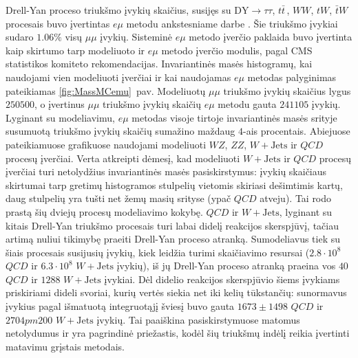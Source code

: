 \documentclass[a4paper, 12pt, oneside]{article}
\newcommand{\ZZ}{Z\! Z}
\newcommand{\WZ}{W\! Z}
\newcommand{\emu}{e\mu}
\newcommand{\WJets}{W\! +\!\mathrm{Jets}}
\newcommand{\DYtau}{\mathrm{DY} \! \rightarrow \! \tau\tau}
\newcommand{\QCD}{QC\! D}
\begin{document}
Drell-Yan proceso triukšmo įvykių skaičius, susijęs su $\DYtau$, $t\bar{t}\,$, $WW$, $tW$, $\bar{t}W$ procesais buvo įvertintas
$\emu$ metodu ankstesniame darbe \cite{MAk2}.
Šie triukšmo įvykiai sudaro $1.06\%$ visų $\mu\mu$ įvykių.
Sisteminė $\emu$ metodo įverčio paklaida buvo įvertinta kaip skirtumo tarp modeliuoto ir $\emu$ metodo įverčio modulis, pagal
CMS statistikos komiteto rekomendacijas.
Invariantinės masės histogramų, kai naudojami vien modeliuoti įverčiai ir kai naudojamas $\emu$ metodas palyginimas pateikiamas
\ref{fig:MassMCemu}~pav.
Modeliuotų $\mu\mu$ triukšmo įvykių skaičius lygus $250500$, o įvertinus $\mu\mu$ triukšmo įvykių skaičių  $e\mu$ metodu
gauta $241105$ įvykių.
Lyginant su modeliavimu, $\emu$ metodas visoje tirtoje invariantinės masės srityje susumuotą triukšmo įvykių skaičių
sumažino maždaug $4$-ais procentais.
Abiejuose pateikiamuose grafikuose naudojami modeliuoti $\WZ$, $\ZZ$, $\WJets$ ir $\QCD$ procesų įverčiai.
Verta atkreipti dėmesį, kad modeliuoti $\WJets$ ir $\QCD$ procesų įverčiai turi netolydžius invariantinės masės pasiskirstymus:
įvykių skaičiaus skirtumai tarp gretimų histogramos stulpelių vietomis skiriasi dešimtimis kartų, daug stulpelių yra tušti
net žemų masių srityse (ypač $\QCD$ atveju).
Tai rodo prastą šių dviejų procesų modeliavimo kokybę.
$\QCD$ ir $\WJets$, lyginant su kitais Drell-Yan triukšmo procesais turi labai didelį reakcijos skerspjūvį, tačiau artimą
nuliui tikimybę praeiti Drell-Yan proceso atranką.
Sumodeliavus tiek su šiais procesais susijusių įvykių, kiek leidžia turimi skaičiavimo resursai ($2.8\cdot10^8$ $\QCD$ ir
$6.3\cdot10^8$ $\WJets$ įvykių), iš jų Drell-Yan proceso atranką praeina vos $40$ $\QCD$ ir $1288$ $\WJets$ įvykiai.
Dėl didelio reakcijos skerspjūvio šiems įvykiams priskiriami dideli svoriai, kurių vertės siekia net iki kelių tūkstančių:
sunormavus įvykius pagal išmatuotą integruotąjį šviesį buvo gauta $1673\pm1498$ $\QCD$ ir $2704pm200$ $\WJets$ įvykių. 
Tai paaiškina pasiskirstymuose matomus netolydumus ir yra pagrindinė priežastis, kodėl šių triukšmų indėlį reikia įvertinti
matavimu grįstais metodais.
\end{document}
